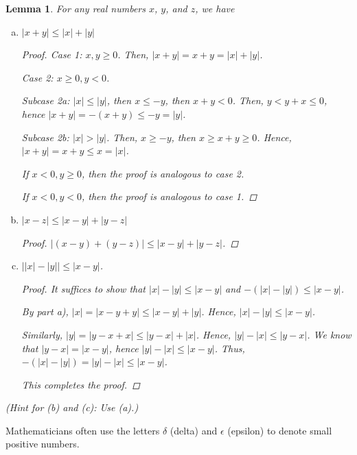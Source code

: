\documentclass[11pt]{article}
\newcommand{\abs}[1]{\lvert #1 \rvert}
\newtheorem{lemma}[theorem]{Lemma}
\theoremstyle{definition}
\newcommand{\hint}[2][Hint]{
	
	(#1: #2)
}
\numberwithin{equation}{section}
\begin{document}
\begin{lemma}
	For any real numbers $x$, $y$, and $z$, we have 
		\begin{enumerate}[(a)]
		\item \quad $\abs{x + y} \leq \abs{x} + \abs{y}$
        

\begin{proof}
Case 1: $x,y \geq 0$. Then, $|x+y|=x+y=|x|+|y|$.

Case 2: $x\geq 0, y<0$. 

Subcase 2a: $|x|\leq |y|$, then $x\leq -y$, then $x+y<0$. Then, $y<y+x\leq 0$, hence $|x+y|=-(x+y)\leq -y=|y|$. 

Subcase 2b: $|x|>|y|$. Then, $x\geq -y$, then $x\geq x+y\geq 0$. Hence, $|x+y|=x+y\leq x=|x|$. 

If $x<0, y\geq 0$, then the proof is analogous to case 2.

If $x<0,y<0$, then the proof is analogous to case 1.

\renewcommand\qedsymbol{QED}
\end{proof}

		\item \quad $\abs{x - z} \leq \abs{x - y} + \abs{y - z}$
        

\begin{proof}
$|(x-y)+(y-z)|\leq |x-y|+|y-z|$. 


\renewcommand\qedsymbol{QED}
\end{proof}
		\item \quad $\abs{\abs{x} - \abs{y}} \leq \abs{x-y}$.
        

\begin{proof}
It suffices to show that $|x|-|y|\leq |x-y|$ and $-(|x|-|y|)\leq |x-y|$. 

By part a), $|x|=|x-y+y|\leq |x-y| + |y|$. Hence, $|x|-|y| \leq |x-y|$. 

Similarly, $|y|=|y-x+x|\leq |y-x|+|x|$. Hence, $|y|-|x|\leq |y-x|$. We know that $|y-x|=|x-y|$, hence $|y|-|x|\leq |x-y|$. Thus, $-(|x|-|y|)=|y|-|x|\leq |x-y|$.

This completes the proof.


\renewcommand\qedsymbol{QED}
\end{proof}

	\end{enumerate}

	\hint[Hint for (b) and (c)]{Use (a).}
\end{lemma}
\medskip

Mathematicians often use the letters $\delta$ (delta) and $\epsilon$ (epsilon) to denote small positive numbers. 
\end{document}
